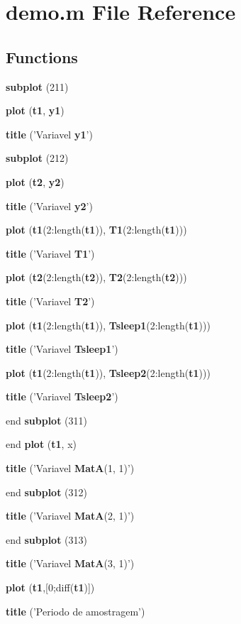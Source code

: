 \section{demo.m File Reference}
\label{libs_2gdatalogger_2demo-xenomai_2matlabdatafiles_2demo_8m}
\subsection*{Functions}
\begin{DoxyCompactItemize}
\item 
{\bf subplot} (211)
\item 
{\bf plot} ({\bf t1}, {\bf y1})
\item 
{\bf title} ('Variavel {\bf y1}')
\item 
{\bf subplot} (212)
\item 
{\bf plot} ({\bf t2}, {\bf y2})
\item 
{\bf title} ('Variavel {\bf y2}')
\item 
{\bf plot} ({\bf t1}(2:length({\bf t1})), {\bf T1}(2:length({\bf t1})))
\item 
{\bf title} ('Variavel {\bf T1}')
\item 
{\bf plot} ({\bf t2}(2:length({\bf t2})), {\bf T2}(2:length({\bf t2})))
\item 
{\bf title} ('Variavel {\bf T2}')
\item 
{\bf plot} ({\bf t1}(2:length({\bf t1})), {\bf Tsleep1}(2:length({\bf t1})))
\item 
{\bf title} ('Variavel {\bf Tsleep1}')
\item 
{\bf plot} ({\bf t1}(2:length({\bf t1})), {\bf Tsleep2}(2:length({\bf t1})))
\item 
{\bf title} ('Variavel {\bf Tsleep2}')
\item 
end {\bf subplot} (311)
\item 
end {\bf plot} ({\bf t1}, x)
\item 
{\bf title} ('Variavel {\bf MatA}(1, 1)')
\item 
end {\bf subplot} (312)
\item 
{\bf title} ('Variavel {\bf MatA}(2, 1)')
\item 
end {\bf subplot} (313)
\item 
{\bf title} ('Variavel {\bf MatA}(3, 1)')
\item 
{\bf plot} ({\bf t1},[0;diff({\bf t1})])
\item 
{\bf title} ('Periodo de amostragem')
\end{DoxyCompactItemize}
